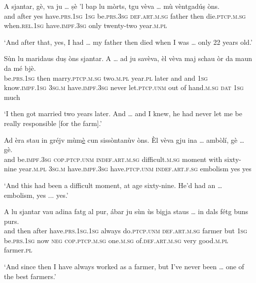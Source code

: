 \begin{linenumbers}
\gll    A sjantar, gè, va ju … ṣè 'l bap lu mòrts, tgu vèva … mù vèntgadúṣ òns.\\
and after yes have.\textsc{prs.1sg} \textsc{1sg} {} be.\textsc{prs.3sg} \textsc{def.art.m.sg} father then die.\textsc{ptcp.m.sg} when.\textsc{rel.1sg} have.\textsc{impf.3sg} {} only twenty-two year.\textsc{m.pl}\\
\end{linenumbers}
\medskip
\glt `And after that, yes, I had … my father then died when I was … only 22 years old.'
\medskip

\begin{linenumbers}
\gll    Sùn lu maridaus duṣ òns sjantar. A … ad ju savèva, èl vèva maj schau òr da maun da mé bjè.\\
be.\textsc{prs.1sg} then marry.\textsc{ptcp.m.sg} two.\textsc{m.pl} year.\textsc{pl} later and {} and \textsc{1sg} know.\textsc{impf.1sg} \textsc{3sg.m} have.\textsc{impf.3sg} never let.\textsc{ptcp.unm} out of hand.\textsc{m.sg} \textsc{dat} \textsc{1sg} much\\
\end{linenumbers}
\medskip
\glt `I then got married two years later. And … and I knew, he had never let me be really responsible [for the farm].'
\medskip

\begin{linenumbers}
\gll    Ad èra stau in gréjv mùm\underline{è} cun sissòntanùv òns. Èl vèva gju ina … ambòlí, gè … gè.\\
and be.\textsc{impf.3sg} \textsc{cop.ptcp.unm} \textsc{indef.art.m.sg} difficult.\textsc{m.sg} moment with sixty-nine year.\textsc{m.pl} \textsc{3sg.m} have.\textsc{impf.3sg} have.\textsc{ptcp.unm} \textsc{indef.art.f.sg} {} embolism yes {} yes\\
\end{linenumbers}
\medskip
\glt `And this had been a difficult moment, at age sixty-nine. He’d had an … embolism, yes ... yes.'
\medskip

\begin{linenumbers}
\gll    A lu sjantar vau adina fatg al pur, ábar ju sùn ùs bigja staus … in dals fétg buns purs.\\
and then after have.\textsc{prs.1sg.1sg} always do.\textsc{ptcp.unm} \textsc{def.art.m.sg} farmer but  \textsc{1sg} be.\textsc{prs.1sg} now \textsc{neg} \textsc{cop.ptcp.m.sg} {} one.\textsc{m.sg} of.\textsc{def.art.m.sg} very good.\textsc{m.pl} farmer.\textsc{pl}\\
\end{linenumbers}
\medskip
\glt `And since then I have always worked as a farmer, but I’ve never been … one of the best farmers.'
\medskip

